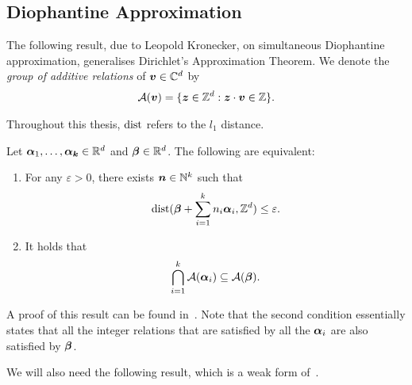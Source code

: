 \subsection{Diophantine Approximation}

The following result, due to Leopold Kronecker, on simultaneous Diophantine approximation, generalises Dirichlet's Approximation Theorem. We denote the \emph{group of additive relations} of $\boldsymbol{v} \in \mathbb{C}^{d}$ by
\begin{align*}
{\cal{A}}(\boldsymbol{v}) = \lbrace \boldsymbol{z} \in \mathbb{Z}^{d} : \boldsymbol{z} \cdot \boldsymbol{v} \in \mathbb{Z} \rbrace .
\end{align*}

Throughout this thesis, $\operatorname{dist}$ refers to the $l_{1}$ distance.

\begin{theorem}[Kronecker]
\label{thm:Kronecker}
Let $\boldsymbol{\alpha}_{1}, \ldots, \boldsymbol{\alpha_{k}} \in \mathbb{R}^{d}$ and $\boldsymbol{\beta} \in \mathbb{R}^{d}$. The following are equivalent:
\begin{enumerate}
\item For any $\varepsilon > 0$, there exists $\boldsymbol{n} \in \mathbb{N}^{k}$ such that
\begin{align*}
\operatorname{dist}(\boldsymbol{\beta} + \sum\limits_{i=1}^{k} n_{i} \boldsymbol{\alpha}_{i}, \mathbb{Z}^{d}) \leq \varepsilon .
\end{align*}
\item It holds that
\begin{align*}
\bigcap\limits_{i=1}^{k} {\cal{A}}(\boldsymbol{\alpha}_{i}) \subseteq {\cal{A}}(\boldsymbol{\beta}) .
\end{align*}
\end{enumerate}
\end{theorem}

A proof of this result can be found in~\cite{Cassels}.
Note that the second condition essentially states that all the integer relations that are satisfied by all the $\boldsymbol{\alpha}_{i}$ are also satisfied by $\boldsymbol{\beta}$.

We will also need the following result, which is a weak form of~\cite[Corollary 2.8]{KhachiyanP97}.

